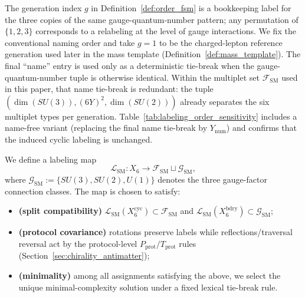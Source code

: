 \begin{remark}\label{rem:order_fsm_generation}
The generation index $g$ in Definition~\ref{def:order_fsm} is a bookkeeping label for the three copies of the same gauge-quantum-number pattern; any permutation of $\{1,2,3\}$ corresponds to a relabeling at the level of gauge interactions.
We fix the conventional naming order and take $g=1$ to be the charged-lepton reference generation used later in the mass template (Definition~\ref{def:mass_template}).
The final ``name'' entry is used only as a deterministic tie-break when the gauge-quantum-number tuple is otherwise identical.
Within the multiplet set $\mathcal{F}_{\mathrm{SM}}$ used in this paper, that name tie-break is redundant: the tuple $(\dim(SU(3)),(6Y)^2,\dim(SU(2)))$ already separates the six multiplet types per generation.
Table~\ref{tab:labeling_order_sensitivity} includes a name-free variant (replacing the final name tie-break by $Y_{\mathrm{num}}$) and confirms that the induced cyclic labeling is unchanged.
\end{remark}

We define a labeling map
\[
\mathcal{L}_{\mathrm{SM}}:X_6\to \mathcal{F}_{\mathrm{SM}}\sqcup \mathcal{G}_{\mathrm{SM}},
\]
where $\mathcal{G}_{\mathrm{SM}}:=\{SU(3),SU(2),U(1)\}$ denotes the three gauge-factor connection classes.
The map is chosen to satisfy:
\begin{itemize}
\item \textbf{(split compatibility)} $\mathcal{L}_{\mathrm{SM}}(X_6^{\mathrm{cyc}})\subset \mathcal{F}_{\mathrm{SM}}$ and $\mathcal{L}_{\mathrm{SM}}(X_6^{\mathrm{bdry}})\subset \mathcal{G}_{\mathrm{SM}}$;
\item \textbf{(protocol covariance)} rotations preserve labels while reflections/traversal reversal act by the protocol-level $P_{\mathrm{prot}}/T_{\mathrm{prot}}$ rules (Section~\ref{sec:chirality_antimatter});
\item \textbf{(minimality)} among all assignments satisfying the above, we select the unique minimal-complexity solution under a fixed lexical tie-break rule.
\end{itemize}

